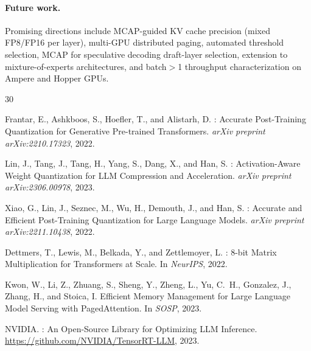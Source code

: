 \documentclass{article}
\begin{document}
\paragraph{Future work.} Promising directions include MCAP-guided KV cache precision
(mixed FP8/FP16 per layer), multi-GPU distributed paging, automated threshold selection,
MCAP for speculative decoding draft-layer selection, extension to mixture-of-experts
architectures, and batch$>$1 throughput characterization on Ampere and Hopper GPUs.




\begin{thebibliography}{30}

Frantar, E., Ashkboos, S., Hoefler, T., and Alistarh, D.
: Accurate Post-Training Quantization for Generative Pre-trained Transformers.
\newblock \emph{arXiv preprint arXiv:2210.17323}, 2022.

Lin, J., Tang, J., Tang, H., Yang, S., Dang, X., and Han, S.
: Activation-Aware Weight Quantization for {LLM} Compression and Acceleration.
\newblock \emph{arXiv preprint arXiv:2306.00978}, 2023.

Xiao, G., Lin, J., Seznec, M., Wu, H., Demouth, J., and Han, S.
: Accurate and Efficient Post-Training Quantization for Large Language Models.
\newblock \emph{arXiv preprint arXiv:2211.10438}, 2022.

Dettmers, T., Lewis, M., Belkada, Y., and Zettlemoyer, L.
: 8-bit Matrix Multiplication for Transformers at Scale.
\newblock In \emph{NeurIPS}, 2022.

Kwon, W., Li, Z., Zhuang, S., Sheng, Y., Zheng, L., Yu, C.~H., Gonzalez, J., Zhang, H., and Stoica, I.
\newblock Efficient Memory Management for Large Language Model Serving with {PagedAttention}.
\newblock In \emph{SOSP}, 2023.

NVIDIA.
: An Open-Source Library for Optimizing {LLM} Inference.
\newblock \url{https://github.com/NVIDIA/TensorRT-LLM}, 2023.


\end{thebibliography}
\end{document}
